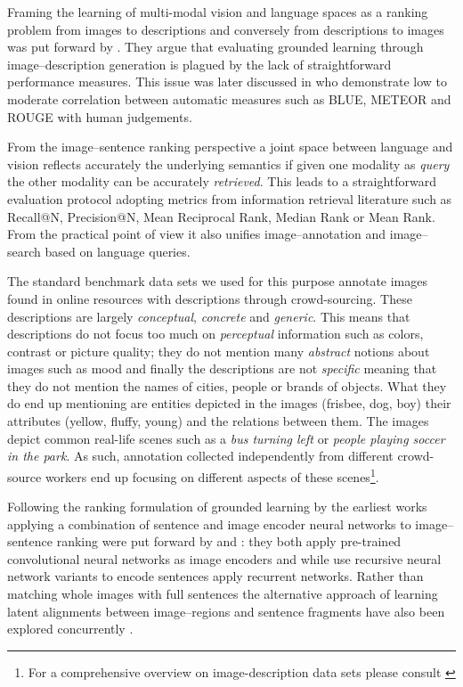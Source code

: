 Framing the learning of multi-modal vision and language spaces as a ranking problem
from images to descriptions and conversely from descriptions to images was
put forward by \cite{hodosh2013framing}.
They argue that evaluating grounded learning through image--description generation
is plagued by the lack of straightforward performance measures.
This issue was later discussed in \cite{elliott2014comparing} who demonstrate low to moderate correlation
between automatic measures such as BLUE, METEOR and ROUGE with human judgements.

From the image--sentence ranking perspective  a joint space between
language and vision reflects accurately
the underlying semantics if given one modality as \emph{query} the other modality
can be accurately \emph{retrieved}.  This leads to a straightforward evaluation protocol
adopting metrics from information retrieval literature such as Recall@N, Precision@N, Mean Reciprocal
Rank, Median Rank or Mean Rank. From the practical point of view it also unifies image--annotation
and image--search based on language queries.

The standard benchmark data sets  we used for this purpose
annotate images found in online resources with descriptions through crowd-sourcing.
These descriptions are largely \emph{conceptual}, \emph{concrete}
and \emph{generic}.
This means that descriptions do not focus too much on \emph{perceptual}
information such as colors, contrast or picture quality; they do not mention
many \emph{abstract} notions about images such as mood and finally the descriptions
are not \emph{specific} meaning that they do not mention the names of cities,
people or brands of objects.
What they do end up mentioning are entities depicted in the images
(frisbee, dog, boy) their attributes (yellow, fluffy, young) and the
relations between them.
The images depict common real-life scenes such as a \emph{bus turning left} or \emph{people
playing soccer in the park}. As such, annotation collected independently from
different crowd-source workers end up focusing on different aspects of
these scenes\footnote{For a comprehensive overview on image-description data sets
please consult \cite{bernardi2016automatic}}.

Following the ranking formulation of grounded learning by \citep{hodosh2013framing}
the earliest works applying a combination of sentence and image encoder neural networks
to image--sentence ranking were put forward by \cite{kiros2014unifying} and \cite{socher2014grounded}:
they both apply pre-trained convolutional neural networks as image encoders and while
\cite{socher2014grounded} use recursive neural network variants to encode sentences
\cite{kiros2014unifying} apply recurrent networks. Rather than matching whole images with full
sentences the alternative approach of learning latent alignments between image--regions and
sentence fragments have also been explored concurrently \citep{karpathy2014deep,karpathy2015deep}.



